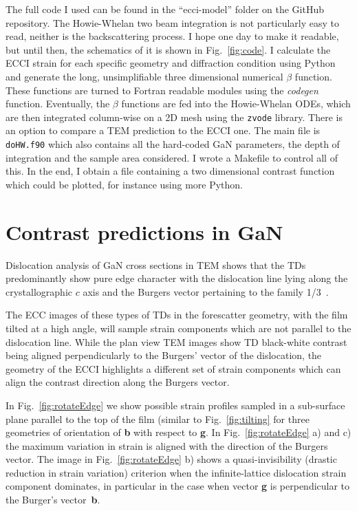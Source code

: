 The full code I used can be found in  the ``ecci-model'' folder on the GitHub repository. The Howie-Whelan two beam integration is not particularly easy  to read, neither is the backscattering process. I hope one day to make it readable, but until then, the schematics of it is shown in Fig.~\ref{fig:code}. I calculate the ECCI strain for each specific geometry and diffraction condition using Python and generate the long, unsimplifiable three dimensional numerical $\beta$ function. These functions are turned to Fortran readable modules using the \textit{codegen} function. Eventually, the $\beta$ functions are fed into the Howie-Whelan ODEs, which are then integrated column-wise on a 2D mesh using the \texttt{zvode} library. There is an option to compare a TEM prediction to the ECCI one.   The main file is \texttt{doHW.f90} which also contains all the hard-coded GaN parameters, the depth of integration and the sample area considered. I wrote a Makefile to control all of this. In the end, I obtain a file containing a two dimensional contrast function which could be plotted, for instance using more Python. 



\section{Contrast predictions in GaN}
\label{sec:contrastGaN}
Dislocation analysis of GaN cross sections in TEM shows that the TDs predominantly show pure edge character with the dislocation line lying along the crystallographic $c$ axis and the Burgers vector pertaining to the family  1/3~\cite{Hino00}.

The ECC images of these types of TDs in the forescatter geometry, with the film tilted at a high angle, will sample strain components which are not parallel to the dislocation line. While the plan view TEM images show TD black-white contrast being aligned perpendicularly to the  Burgers' vector of the dislocation, the geometry of the ECCI highlights a different set of strain components which can align the contrast direction along the Burgers vector.

In Fig.~\ref{fig:rotateEdge} we show possible strain profiles sampled in a sub-surface plane parallel to the top of the film (similar to Fig.~\ref{fig:tilting} for three geometries of orientation of \textbf{b} with respect to \textbf{g}. In Fig.~\ref{fig:rotateEdge} a) and c) the maximum variation in strain is aligned with the direction of the Burgers vector. The image in Fig.~\ref{fig:rotateEdge} b) shows a quasi-invisibility (drastic reduction in strain variation) criterion when the infinite-lattice dislocation strain component dominates, in particular in the case when vector \textbf{g} is perpendicular to the Burger's vector~\textbf{b}.

